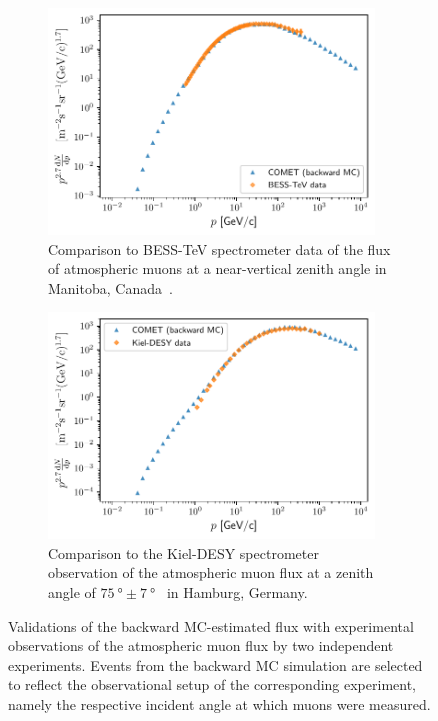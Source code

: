 \begin{figure}
    \centering
    \begin{subfigure}[t]{0.49\textwidth}
        \centering
        \includegraphics[width=0.95\textwidth]{chapter5/comparison_besstev.pdf}
        \caption{ Comparison to BESS-TeV spectrometer data of the flux of
            atmospheric muons at a near-vertical zenith angle in Manitoba,
            Canada~\cite{besstev}. }
        \label{fig:bmc_validations_bess}
    \end{subfigure}
    \hfill
    \begin{subfigure}[t]{0.49\textwidth}
        \centering
        \includegraphics[width=0.95\textwidth]{chapter5/comparison_kieldesy.pdf}
        \caption{ 
            Comparison to the Kiel-DESY spectrometer observation of the
            atmospheric muon flux at a zenith angle of $\SI{75}{\degree} \pm
            \SI{7}{\degree}$~\cite{kieldesy} in Hamburg, Germany.}
        \label{fig:bmc_validations_kiel}
    \end{subfigure}
    \caption{ Validations of the backward MC-estimated flux with
        experimental observations of the atmospheric muon flux by two
        independent experiments. Events from the backward MC simulation are
        selected to reflect the observational setup of the corresponding
        experiment, namely the respective incident angle at which muons were
        measured. }
    \label{fig:bmc_validations}
\end{figure}

